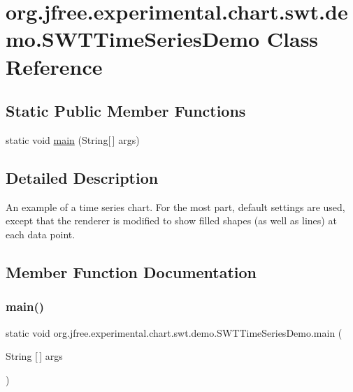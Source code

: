 \hypertarget{classorg_1_1jfree_1_1experimental_1_1chart_1_1swt_1_1demo_1_1_s_w_t_time_series_demo}{}\section{org.\+jfree.\+experimental.\+chart.\+swt.\+demo.\+S\+W\+T\+Time\+Series\+Demo Class Reference}
\label{classorg_1_1jfree_1_1experimental_1_1chart_1_1swt_1_1demo_1_1_s_w_t_time_series_demo}
\subsection*{Static Public Member Functions}
\begin{DoxyCompactItemize}
\item 
static void \mbox{\hyperlink{classorg_1_1jfree_1_1experimental_1_1chart_1_1swt_1_1demo_1_1_s_w_t_time_series_demo_a83dd30fe736d4f2d85937ea3de3c0fc0}{main}} (String\mbox{[}$\,$\mbox{]} args)
\end{DoxyCompactItemize}


\subsection{Detailed Description}
An example of a time series chart. For the most part, default settings are used, except that the renderer is modified to show filled shapes (as well as lines) at each data point. 

\subsection{Member Function Documentation}
\mbox{\label{classorg_1_1jfree_1_1experimental_1_1chart_1_1swt_1_1demo_1_1_s_w_t_time_series_demo_a83dd30fe736d4f2d85937ea3de3c0fc0}} 
\subsubsection{\texorpdfstring{main()}{main()}}
{\footnotesize\ttfamily static void org.\+jfree.\+experimental.\+chart.\+swt.\+demo.\+S\+W\+T\+Time\+Series\+Demo.\+main (\begin{DoxyParamCaption}\item[{String \mbox{[}$\,$\mbox{]}}]{args }\end{DoxyParamCaption})\hspace{0.3cm}{\ttfamily [static]}}

